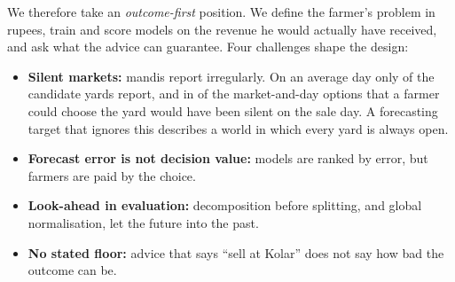 \documentclass{ieeeaccess}
\begin{document}
We therefore take an \emph{outcome-first} position. We define the farmer's problem in rupees, train and score models on the revenue he would actually have received, and ask what the advice can guarantee. Four challenges shape the design:
\begin{itemize}
\item \textbf{Silent markets:} mandis report irregularly. On an average day only \AvgReporting{} of the \NMkt{} candidate yards report, and in \SilentShare{} of the market-and-day options that a farmer could choose the yard would have been silent on the sale day. A forecasting target that ignores this describes a world in which every yard is always open.
\item \textbf{Forecast error is not decision value:} models are ranked by error, but farmers are paid by the choice.
\item \textbf{Look-ahead in evaluation:} decomposition before splitting, and global normalisation, let the future into the past.
\item \textbf{No stated floor:} advice that says ``sell at Kolar'' does not say how bad the outcome can be.
\end{itemize}
\end{document}
